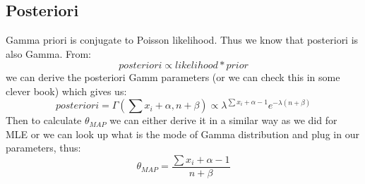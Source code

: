 \documentclass{article}
\begin{document}
\subsection{Posteriori}
Gamma priori is conjugate to Poisson likelihood. Thus we know that posteriori is also Gamma. From:
\begin{equation}
    posteriori \propto likelihood * prior
\end{equation}
we can derive the posteriori Gamm parameters (or we can check this in some clever book) which gives us:
\begin{equation}
posteriori = \Gamma(\sum x_i + \alpha, n + \beta) \propto \lambda^{\sum x_i + \alpha-1} e^{-\lambda(n+\beta)}    
\end{equation}
Then to calculate $\theta_{MAP}$ we can either derive it in a similar way as we did for MLE or we can look up what is the mode 
of Gamma distribution and plug in our parameters, thus:
\begin{equation}
\theta_{MAP} = \frac{\sum x_i + \alpha -1}{n + \beta}     
\end{equation}
\end{document}
